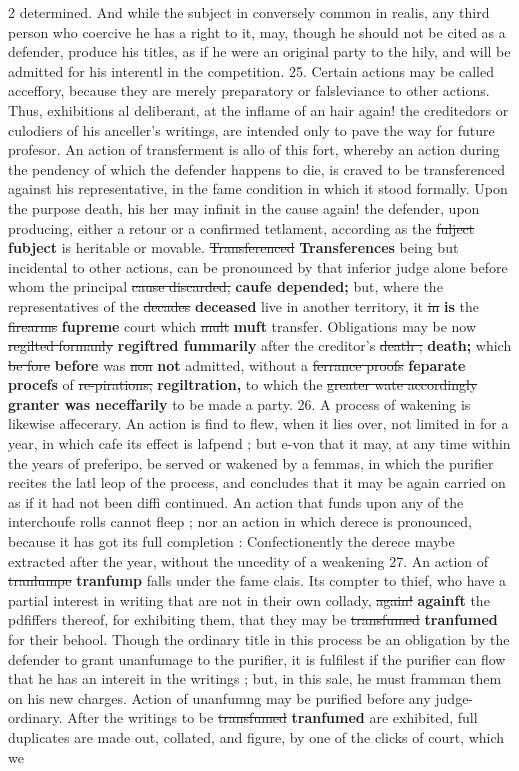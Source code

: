 \documentclass[10pt]{article}
\begin{document}
\begin{multicols}{2}
determined. And while the subject in conversely common in realis, any third person who coercive he has a right to it, may, though he should not be cited as a defender, produce his titles, as if he were an original party to the hily, and will be admitted for his interentl in the competition. 25. Certain actions may be called acceffory, because they are merely preparatory or falsleviance to other actions. Thus, exhibitions al deliberant, at the inflame of an hair again! the creditedors or culodiers of his anceller's writings, are intended only to pave the way for future profesor. An action of transferment is allo of this fort, whereby an action during the pendency of which the defender happens to die, is craved to be transferenced against his representative, in the fame condition in which it stood formally. Upon the purpose death, his her may infinit in the cause again! the defender, upon producing, either a retour or a confirmed tetlament, according as the \sout{fulject} \textbf{fubject} is heritable or movable. \sout{Transferenced} \textbf{Transferences} being but incidental to other actions, can be pronounced by that inferior judge alone before whom the principal \sout{cause discarded,} \textbf{caufe depended;} but, where the representatives of the \sout{decades} \textbf{deceased} live in another territory, it \sout{in} \textbf{is} the \sout{firearms} \textbf{fupreme} court which \sout{mult} \textbf{muft} transfer. Obligations may be now \sout{regilted formanly} \textbf{regiftred fummarily} after the creditor's \sout{death ;} \textbf{death;} which \sout{be fore} \textbf{before} was \sout{non} \textbf{not} admitted, without a \sout{ferrance proofs} \textbf{feparate procefs} of \sout{re-pirations,} \textbf{regiltration,} to which the \sout{greater wate accordingly} \textbf{granter was neceffarily} to be made a party. 26. A process of wakening is likewise affecerary. An action is find to flew, when it lies over, not limited in for a year, in which cafe its effect is lafpend ; but e-von that it may, at any time within the years of preferipo, be served or wakened by a femmas, in which the purifier recites the latl leop of the process, and concludes that it may be again carried on as if it had not been diffi continued. An action that funds upon any of the interchoufe rolls cannot fleep ; nor an action in which derece is pronounced, because it has got its full completion : Confectionently the derece maybe extracted after the year, without the uncedity of a weakening 27. An action of \sout{tranlumpe} \textbf{tranfump} falls under the fame clais. Its compter to thief, who have a partial interest in writing that are not in their own collady, \sout{again!} \textbf{againft} the pdfiffers thereof, for exhibiting them, that they may be \sout{transfumed} \textbf{tranfumed} for their behool. Though the ordinary title in this process be an obligation by the defender to grant unanfumage to the purifier, it is fulfilest if the purifier can flow that he has an intereit in the writings ; but, in this sale, he must framman them on his new charges. Action of unanfumng may be purified before any judge-ordinary. After the writings to be \sout{transfumed} \textbf{tranfumed} are exhibited, full duplicates are made out, collated, and figure, by one of the clicks of court, which we 
\end{multicols}
\end{document}

